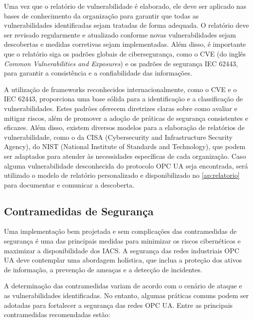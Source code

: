     Uma vez que o relatório de vulnerabilidade é elaborado, ele deve ser aplicado nas bases de conhecimento da organização para garantir que todas as vulnerabilidades identificadas sejam tratadas de forma adequada. O relatório deve ser revisado regularmente e atualizado conforme novas vulnerabilidades sejam descobertas e medidas corretivas sejam implementadas. Além disso, é importante que o relatório siga os padrões globais de cibersegurança, como o CVE (do inglês \textit{Common Vulnerabilities and Exposures}) e os padrões de segurança IEC 62443, para garantir a consistência e a confiabilidade das informações.

    A utilização de frameworks reconhecidos internacionalmente, como o CVE e o IEC 62443, proporciona uma base sólida para a identificação e a classificação de vulnerabilidades. Estes padrões oferecem diretrizes claras sobre como avaliar e mitigar riscos, além de promover a adoção de práticas de segurança consistentes e eficazes. Além disso, existem diversos modelos para a elaboração de relatórios de vulnerabilidade, como o da CISA (Cybersecurity and Infrastructure Security Agency), do NIST (National Institute of Standards and Technology), que podem ser adaptados para atender às necessidades específicas de cada organização. Caso alguma vulnerabilidade desconhecida do protocolo OPC UA seja encontrada, será utilizado o modelo de relatório personalizado e disponibilizado no \autoref{ap:relatorio} para documentar e comunicar a descoberta.

    \subsection{Contramedidas de Segurança}

    Uma implementação bem projetada e sem complicações das contramedidas de segurança é uma das principais medidas para minimizar os riscos cibernéticos e maximizar a disponibilidade dos IACS. A segurança das redes industriais OPC UA deve contemplar uma abordagem holística, que inclua a proteção dos ativos de informação, a prevenção de ameaças e a detecção de incidentes.

    A determinação das contramedidas variam de acordo com o cenário de ataque e as vulnerabilidades identificadas. No entanto, algumas práticas comuns podem ser adotadas para fortalecer a segurança das redes OPC UA. Entre as principais contramedidas recomendadas estão:

